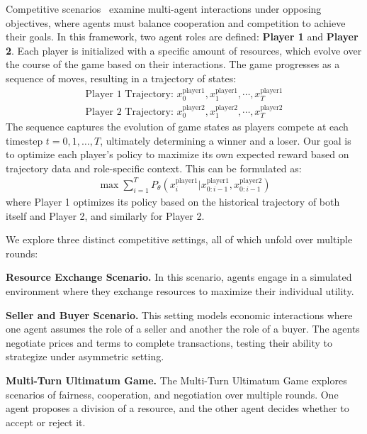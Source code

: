 Competitive scenarios~\citep{bianchi2024well} examine multi-agent interactions under opposing objectives, where agents must balance cooperation and competition to achieve their goals. In this framework, two agent roles are defined: \textbf{Player 1} and \textbf{Player 2}. Each player is initialized with a specific amount of resources, which evolve over the course of the game based on their interactions.  The game progresses as a sequence of moves, resulting in a trajectory of states:  
\begin{equation}
\begin{aligned}
\text{Player 1 Trajectory: } x_0^{\text{player}1},x_1^{\text{player}1},\cdots,x_T^{\text{player}1}\\
\text{Player 2 Trajectory: }x_0^{\text{player}2},x_1^{\text{player}2},\cdots,x_T^{\text{player}2}
\end{aligned}
\end{equation}
The sequence captures the evolution of game states as players compete at each timestep $t = 0, 1, \dots, T $, ultimately determining a winner and a loser. Our goal is to optimize each player's policy to maximize its own expected reward based on trajectory data and role-specific context. This can be formulated as:
\begin{equation}
\begin{aligned}
\max \sum_{i=1}^T P_\theta(x_i^{\text{player1}} | x_{0:i-1}^{\text{player1}}, x_{0:i-1}^{\text{player2}})
\end{aligned}
\end{equation}
where Player 1 optimizes its policy based on the historical trajectory of both itself and Player 2, and similarly for Player 2.

We explore three distinct competitive settings, all of which unfold over multiple rounds:

\textbf{Resource Exchange Scenario.} 
In this scenario, agents engage in a simulated environment where they exchange resources to maximize their individual utility. 

\textbf{Seller and Buyer Scenario.}  
This setting models economic interactions where one agent assumes the role of a seller and another the role of a buyer. The agents negotiate prices and terms to complete transactions, testing their ability to strategize under asymmetric setting. 

\textbf{Multi-Turn Ultimatum Game.}  
The Multi-Turn Ultimatum Game explores scenarios of fairness, cooperation, and negotiation over multiple rounds. One agent proposes a division of a resource, and the other agent decides whether to accept or reject it.  


